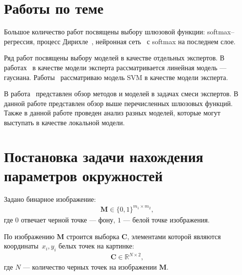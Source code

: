 \documentclass[12pt, twoside]{article}
\numberwithin{equation}{section}
\begin{document}
\section{Работы по теме}
Большое количество работ посвящены выбору шлюзовой функции: softmax--регрессия, процесс Дирихле~\cite{Edward2002}, нейронная сеть~\cite{Shazeer2017} с softmax на последнем слое.

Ряд работ посвящены выбору моделей в качестве отдельных экспертов. В работах~\cite{Jordan1994, Jordan1991} в качестве модели эксперта рассматривается линейная модель --- гаусиана. Работы~\cite{Lima2007, Cao2003} рассматриваю модель SVM в качестве модели эксперта.

В работа~\cite{Yuksel2012} представлен обзор методов и моделей в задачах смеси экспертов. В данной работе представлен обзор выше перечисленных шлюзовых функций. Также в данной работе проведен анализ разных моделей, которые могут выступать в качестве локальной модели.


\section{Постановка задачи нахождения параметров окружностей}
Задано бинарное изображение:
\begin{equation}
\label{eq:st:cr:1}
\begin{aligned}
\textbf{M} \in \{0,1\}^{m_1 \times m_2},
\end{aligned}
\end{equation}
где $0$ отвечает черной точке --- фону, $1$ --- белой точке изображения.

По изображению $\textbf{M}$ строится выборка $\textbf{C}$, элементами которой являются координаты~$x_i, y_i$ белых точек на картинке:
\begin{equation}
\label{eq:st:cr:2}
\begin{aligned}
\textbf{C} \in  \mathbb{R}^{N \times 2},
\end{aligned}
\end{equation}
где $N$ --- количество черных точек на изображении $\textbf{M}$.
\end{document}
